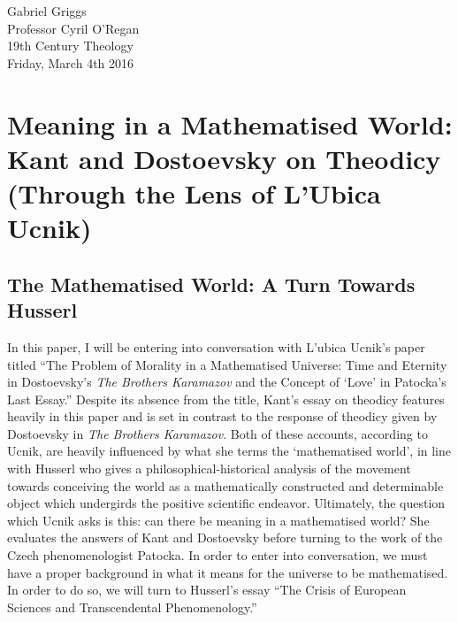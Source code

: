 \documentclass[12pt]{article}
\begin{document}
\singlespacing
{\raggedleft{}Gabriel Griggs} \\
Professor Cyril O'Regan \\
19th Century Theology \\
Friday, March 4th 2016\\

\section*{Meaning in a Mathematised World: Kant and Dostoevsky on Theodicy (Through the Lens of L'Ubica Ucnik)}

\doublespacing
\subsection*{The Mathematised World: A Turn Towards Husserl}

In this paper, I will be entering into conversation with L'ubica Ucnik's paper titled ``The Problem of Morality in a Mathematised Universe: Time and Eternity in Dostoevsky's \emph{The Brothers Karamazov} and the Concept of `Love' in Patocka's Last Essay.'' Despite its absence from the title, Kant's essay on theodicy features heavily in this paper and is set in contrast to the response of theodicy given by Dostoevsky in \emph{The Brothers Karamazov}. Both of these accounts, according to Ucnik, are heavily influenced by what she terms the `mathematised world', in line with Husserl who gives a philosophical-historical analysis of the movement towards conceiving the world as a mathematically constructed and determinable object which undergirds the positive scientific endeavor. Ultimately, the question which Ucnik asks is this: can there be meaning in a mathematised world? She evaluates the answers of Kant and Dostoevsky before turning to the work of the Czech phenomenologist Patocka. In order to enter into conversation, we must have a proper background in what it means for the universe to be mathematised. In order to do so, we will turn to Husserl's essay ``The Crisis of European Sciences and Transcendental Phenomenology.'' 
\end{document}
